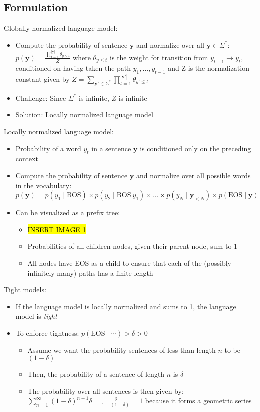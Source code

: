 \subsection*{Formulation}
Globally normalized language model:
\begin{itemize}
    \item Compute the probability of sentence $\boldsymbol{y}$ and normalize over all $\boldsymbol{y} \in \Sigma^*$:
    $
    p(\boldsymbol{y}) = \frac{\prod_{t=1}^{|\boldsymbol{y}|} \theta_{y \leq t}}{Z}
    $
    where $\theta_{y \leq t}$ is the weight for transition from $y_{t-1} \to y_t$, conditioned on having taken the path $y_1, \ldots, y_{t-1}$ and Z is the normalization constant given by $Z = \sum_{\boldsymbol{y'} \in \Sigma^*} \prod_{t=1}^{|\boldsymbol{y'}|} \theta_{y' \leq t}$
    \item Challenge: Since $\Sigma^*$ is infinite, $Z$ is infinite
    \item Solution: Locally normalized language model
\end{itemize}
Locally normalized language model:
\begin{itemize}
    \item Probability of a word $y_t$ in a sentence $\boldsymbol{y}$ is conditioned only on the preceding context
    \item Compute the probability of sentence $\boldsymbol{y}$ and normalize over all possible words in the vocabulary:
    $
    p(\boldsymbol{y}) = p(y_1 \mid \textrm{BOS}) \times p(y_2 \mid  \textrm{BOS} \ y_1) \times ... \times p(y_N \mid \boldsymbol{y}_{<N}) \times p(\textrm{EOS} \mid \boldsymbol{y})
    $
    \item Can be visualized as a prefix tree:
    \begin{itemize}
        \item \hl{INSERT IMAGE 1}
        \item Probabilities of all children nodes, given their parent node, sum to 1
        \item All nodes have EOS as a child to ensure that each of the (possibly infinitely many) paths has a finite length
    \end{itemize}
\end{itemize}
Tight models:
\begin{itemize}
    \item If the language model is locally normalized and sums to 1, the language model is \emph{tight}
    \item To enforce tightness:
    $
    p(\textrm{EOS} \mid \cdots) > \delta > 0
    $
    \begin{itemize}
        \item Assume we want the probability sentences of less than length $n$ to be $(1-\delta)$
        \item Then, the probability of a sentence of length $n$ is $\delta$
        \item The probability over all sentences is then given by: $
        \sum_{n=1}^\infty (1-\delta)^{n-1} \delta = \frac{\delta}{1-(1-\delta)} = 1
        $ because it forms a geometric series
    \end{itemize}
\end{itemize}
